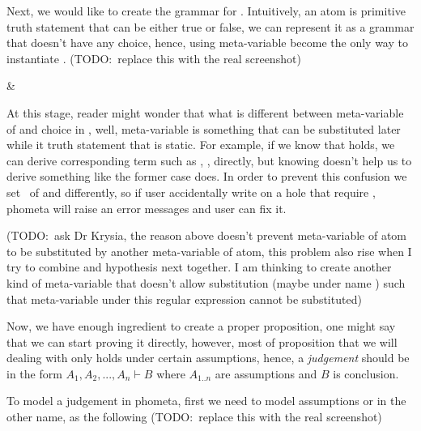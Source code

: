 \documentclass[master.tex]{subfiles}
\begin{document}
Next, we would like to create the grammar for . Intuitively, an atom
is primitive truth statement that can be either true or false, we can represent
it as a grammar that doesn't have any choice, hence, using meta-variable become
the only way to instantiate . (TODO:\ replace this with the real
screenshot)

 {
    \kVarRegex &  \\
}

At this stage, reader might wonder that what is different between meta-variable
of  and  choice in , well, meta-variable is
something that can be substituted later while  it truth statement that
is static. For example,
if we know that  holds, we can derive
corresponding term such as \bat{\propTop\propOr\bat{\propNot\propTop}},
,
directly, but knowing
 doesn't
help us to derive something like the former case does. In order to prevent this
confusion we set \kVarRegex\ of  and  differently, so if
user accidentally write  on a hole that require , phometa
will raise an error messages and user can fix it.

(TODO:\ ask Dr Krysia, the reason above doesn't prevent meta-variable of atom to
be substituted by another meta-variable of atom, this problem also rise when I
try to combine  and hypothesis next together. I am
thinking to create another kind of meta-variable that doesn't allow substitution
(maybe under name ) such that meta-variable under this regular
expression cannot be substituted)

Now, we have enough ingredient to create a proper proposition, one might say
that we can start proving it directly, however, most of proposition that we will
dealing with only holds under certain assumptions, hence, a \emph{judgement}
should be in the form $A_1, A_2, ..., A_n \vdash B$ where $A_{1..n}$ are
assumptions and $B$ is conclusion.

To model a judgement in phometa, first we need to model assumptions or in the
other name,  as the following (TODO:\ replace this with the real
screenshot)
\end{document}
